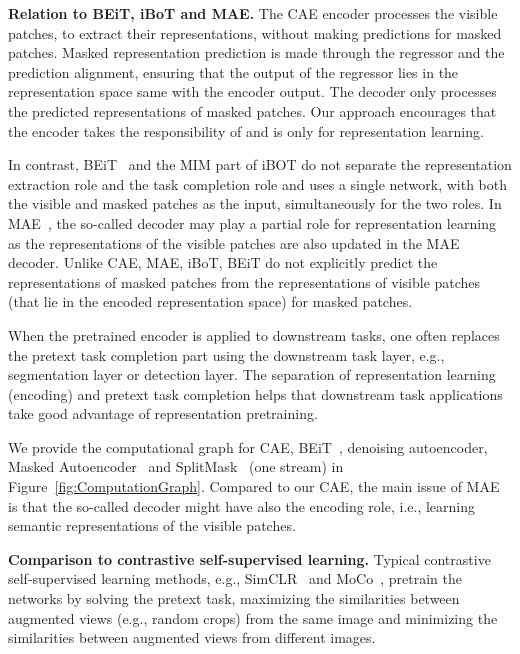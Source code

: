 \documentclass[twocolumn]{svjour3}          \smartqed  \usepackage{graphicx}
\begin{document}
\vspace{1mm}
\noindent\textbf{Relation to BEiT, iBoT and MAE.}
The CAE encoder processes
the visible patches,
to extract their representations,
without making predictions for masked patches.
Masked representation prediction 
is made through the regressor and the prediction alignment,
ensuring that the output of the regressor
lies in the representation space same with 
the encoder output.
The decoder only processes
the predicted representations
of masked patches.
Our approach encourages that 
the encoder takes the responsibility
of 
and is only for 
representation learning.

In contrast,
BEiT~\cite{bao2021beit}
and the MIM part of iBOT do not separate 
the representation extraction role
and the task completion role
and uses a single network,
with both the visible and masked patches
as the input,
simultaneously for the two roles.
In MAE~\cite{he2021masked}, the so-called decoder
may play a partial role
for representation learning
as the representations of the visible patches
are also updated in the MAE decoder. 
Unlike CAE, MAE, iBoT, BEiT
do not explicitly 
predict the representations
of masked patches from
the representations of visible patches
(that lie in the encoded representation space)
for masked patches.

When the pretrained encoder is applied to downstream tasks,
one often replaces the pretext task completion part
using the downstream task layer,
e.g., segmentation layer or detection layer.
The separation of representation learning (encoding)
and pretext task completion
helps that downstream task applications
take good advantage of representation pretraining.



We provide 
the computational graph 
for CAE, BEiT~\cite{bao2021beit}, denoising autoencoder, Masked Autoencoder~\cite{he2021masked}
and SplitMask~\cite{el2021large}
(one stream)
in Figure~\ref{fig:ComputationGraph}.
Compared to our CAE,
the main issue of MAE is that the so-called decoder 
might have also the encoding role,
i.e.,
learning semantic representations of
the visible patches.





 \vspace{1mm}
\noindent\textbf{Comparison to contrastive self-supervised learning.}
Typical contrastive self-supervised learning methods,
e.g., SimCLR~\cite{ChenK0H20}
and MoCo~\cite{He0WXG20,ChenXH21},
pretrain the networks
by solving the pretext task,
maximizing the similarities between augmented views
(e.g., random crops)
from the same image
and minimizing the similarities
between augmented views from different images.
\end{document}
